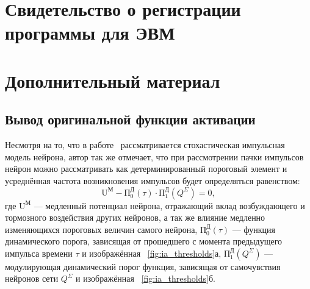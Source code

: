 \appendix
\setlength{\midchapskip}{20pt}
\renewcommand*{\afterchapternum}{\par\nobreak\vskip \midchapskip}
\renewcommand\thechapter{\Asbuk{chapter}} %


\chapter{Свидетельство о регистрации программы для ЭВМ} \label{appendix:programm_registration}
\begin{figure}[ht]
\end{figure}


\chapter{Дополнительный материал} \label{appendix:math}

\section{Вывод оригинальной функции активации}  \label{appendix:activation_function}

Несмотря на то, что в работе~\cite{EmelyanovYaroslavsky1990} рассматривается стохастическая импульсная модель нейрона, автор так же отмечает, что при рассмотрении \socalled пачки импульсов нейрон можно рассматривать как детерминированный пороговый элемент и усреднённая частота возникновения импульсов будет определяться равенством: $$\text{U}^\text{М} - \text{П}_{0}^\text{Д}(\tau) \cdot \text{П}_{1}^\text{Д}(Q^\Sigma) = 0 ,$$ где $\text{U}^\text{М}$ --- медленный потенциал нейрона, отражающий вклад возбуждающего и тормозного воздействия других нейронов, а так же влияние медленно изменяющихся пороговых величин самого нейрона, $\text{П}_{0}^\text{Д}(\tau)$ --- функция динамического порога, зависящая от прошедшего с момента предыдущего импульса времени $\tau$ и изображённая \onfigure~\ref{fig:ia_thresholds}а, $\text{П}_{1}^\text{Д}(Q^\Sigma)$ --- модулирующая динамический порог функция, зависящая от \socalled самочувствия нейронов сети $Q^\Sigma$ и изображённая \onfigure~\ref{fig:ia_thresholds}б.

